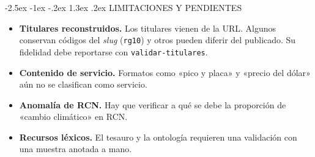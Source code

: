 \documentclass[10pt,twocolumn]{article}
\makeatletter
\renewcommand{\section}{\@startsection{section}{1}{\z@}%
  {-2.5ex \@plus -1ex \@minus -.2ex}%
  {1.3ex \@plus .2ex}%
  {\normalfont\large\bfseries\centering}}
\makeatother
\begin{document}
\section{LIMITACIONES Y PENDIENTES}

\begin{itemize}
\item \textbf{Titulares reconstruidos.} Los titulares vienen de la URL. Algunos
conservan códigos del \textit{slug} (\texttt{rg10}) y otros pueden diferir del
publicado. Su fidelidad debe reportarse con \texttt{validar-titulares}.
\item \textbf{Contenido de servicio.} Formatos como «pico y placa» y «precio del
dólar» aún no se clasifican como servicio.
\item \textbf{Anomalía de RCN.} Hay que verificar a qué se debe la proporción de
«cambio climático» en RCN.
\item \textbf{Recursos léxicos.} El tesauro y la ontología requieren una
validación con una muestra anotada a mano.
\end{itemize}



\end{document}
